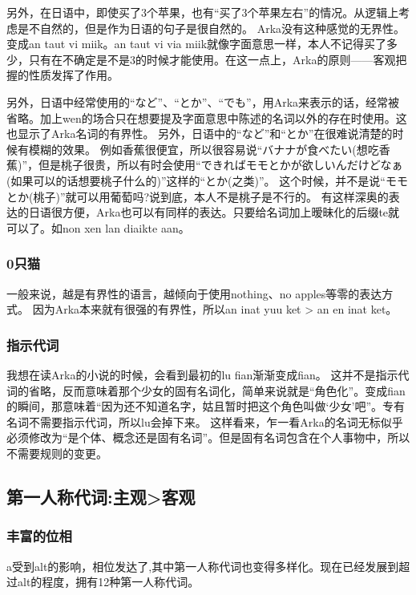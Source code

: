 另外，在日语中，即使买了3个苹果，也有“买了3个苹果左右”的情况。从逻辑上考虑是不自然的，但是作为日语的句子是很自然的。
Arka没有这种感觉的无界性。变成an taut vi miik。an taut vi via miik就像字面意思一样，本人不记得买了多少，只有在不确定是不是3的时候才能使用。在这一点上，Arka的原则——客观把握的性质发挥了作用。

另外，日语中经常使用的“など”、“とか”、“でも”，用Arka来表示的话，经常被省略。加上wen的场合只在想要提及字面意思中陈述的名词以外的存在时使用。这也显示了Arka名词的有界性。
另外，日语中的“など”和“とか”在很难说清楚的时候有模糊的效果。
例如香蕉很便宜，所以很容易说“バナナが食べたい(想吃香蕉)”，但是桃子很贵，所以有时会使用“できればモモとかが欲しいんだけどなぁ(如果可以的话想要桃子什么的)”这样的“とか(之类)”。
这个时候，并不是说“モモとか(桃子)”就可以用葡萄吗?说到底，本人不是桃子是不行的。
有这样深奥的表达的日语很方便，Arka也可以有同样的表达。只要给名词加上暧昧化的后缀te就可以了。如non xen lan diaikte aan。

\subsubsection{0只猫}

一般来说，越是有界性的语言，越倾向于使用nothing、no apples等零的表达方式。
因为Arka本来就有很强的有界性，所以an inat yuu ket > an en inat ket。

\subsubsection{指示代词}

我想在读Arka的小说的时候，会看到最初的lu fian渐渐变成fian。
这并不是指示代词的省略，反而意味着那个少女的固有名词化，简单来说就是“角色化”。变成fian的瞬间，那意味着“因为还不知道名字，姑且暂时把这个角色叫做‘少女’吧”。专有名词不需要指示代词，所以lu会掉下来。
这样看来，乍一看Arka的名词无标似乎必须修改为“是个体、概念还是固有名词”。但是固有名词包含在个人事物中，所以不需要规则的变更。

\subsection{第一人称代词:主观>客观}

\subsubsection{丰富的位相}

a受到alt的影响，相位发达了,其中第一人称代词也变得多样化。现在已经发展到超过alt的程度，拥有12种第一人称代词。

